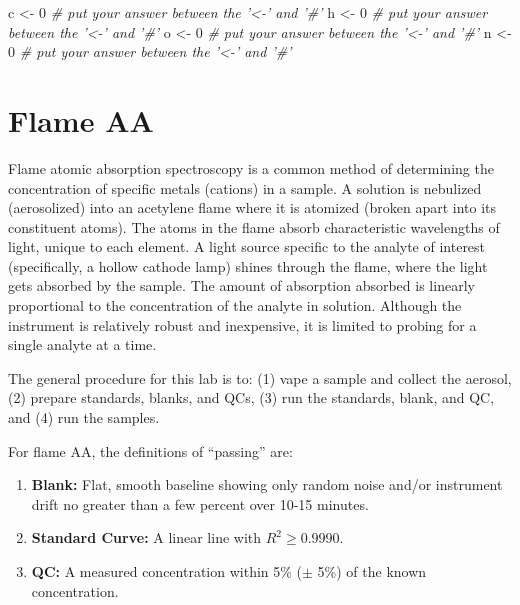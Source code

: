 \documentclass[]{tufte-book}
\newenvironment{Shaded}{}{}
\newcommand{\CommentTok}[1]{\textcolor[rgb]{0.38,0.63,0.69}{\textit{#1}}}
\newcommand{\DecValTok}[1]{\textcolor[rgb]{0.25,0.63,0.44}{#1}}
\newcommand{\NormalTok}[1]{#1}
\newcommand{\StringTok}[1]{\textcolor[rgb]{0.25,0.44,0.63}{#1}}
\providecommand{\tightlist}{%
  \setlength{\itemsep}{0pt}\setlength{\parskip}{0pt}}
\begin{document}
\begin{Shaded}
\begin{Highlighting}[]
\NormalTok{c <-}\StringTok{ }\DecValTok{0}     \CommentTok{# put your answer between the '<-' and '#'}
\NormalTok{h <-}\StringTok{ }\DecValTok{0}     \CommentTok{# put your answer between the '<-' and '#'}
\NormalTok{o <-}\StringTok{ }\DecValTok{0}     \CommentTok{# put your answer between the '<-' and '#'}
\NormalTok{n <-}\StringTok{ }\DecValTok{0}     \CommentTok{# put your answer between the '<-' and '#'}
\end{Highlighting}
\end{Shaded}

\newpage

\hypertarget{flame-aa}{%
\section{Flame AA}\label{flame-aa}}

Flame atomic absorption spectroscopy is a common method of determining the concentration of specific metals (cations) in a sample. A solution is nebulized (aerosolized) into an acetylene flame where it is atomized (broken apart into its constituent atoms). The atoms in the flame absorb characteristic wavelengths of light, unique to each element. A light source specific to the analyte of interest (specifically, a hollow cathode lamp) shines through the flame, where the light gets absorbed by the sample. The amount of absorption absorbed is linearly proportional to the concentration of the analyte in solution. Although the instrument is relatively robust and inexpensive, it is limited to probing for a single analyte at a time.

The general procedure for this lab is to: (1) vape a sample and collect the aerosol, (2) prepare standards, blanks, and QCs, (3) run the standards, blank, and QC, and (4) run the samples.

For flame AA, the definitions of ``passing'' are:

\begin{enumerate}
\def\labelenumi{\arabic{enumi}.}
\tightlist
\item
  \textbf{Blank:} Flat, smooth baseline showing only random noise and/or instrument drift no greater than a few percent over 10-15 minutes.\\
\item
  \textbf{Standard Curve:} A linear line with \(R^2 \ge 0.9990\).\\
\item
  \textbf{QC:} A measured concentration within 5\% (\(\pm\) 5\%) of the known concentration.
\end{enumerate}
\end{document}
